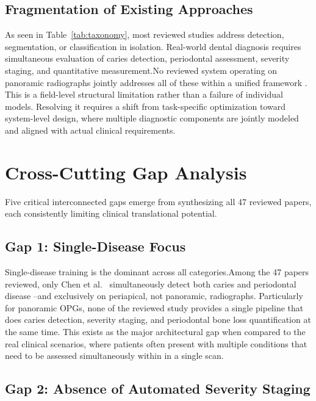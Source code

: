 \documentclass[conference]{IEEEtran}
\begin{document}
\subsection{Fragmentation of Existing Approaches}

As seen in Table~\ref{tab:taxonomy}, most reviewed studies address  detection, segmentation, or classification in isolation.
Real-world dental diagnosis requires simultaneous evaluation of caries detection, periodontal assessment, severity staging, and quantitative measurement.No reviewed system operating on panoramic radiographs jointly addresses all of these within a unified framework .
This is a field-level structural limitation rather than a failure of individual models.
Resolving it requires a shift from task-specific optimization toward system-level design, where multiple diagnostic components are jointly modeled and aligned with actual clinical requirements.


\section{Cross-Cutting Gap Analysis}
\label{sec:gaps}

Five critical interconnected gaps emerge from synthesizing all 47 reviewed papers, each consistently limiting clinical translational potential.


\subsection{Gap 1: Single-Disease Focus}

Single-disease training is the dominant across all categories.Among the 47 papers reviewed, only Chen et al.~\cite{chen2023deep}
simultaneously detect both caries and periodontal disease –and exclusively on periapical, not panoramic, radiographs. Particularly for panoramic OPGs, none of the reviewed study provides a single pipeline that does caries detection, severity staging, and periodontal bone loss quantification at the same time. This exists as the major architectural gap when compared to the real clinical scenarios, where patients often present with multiple
conditions that need to be assessed simultaneously within in a single scan.

\subsection{Gap 2: Absence of Automated Severity Staging}
\end{document}
